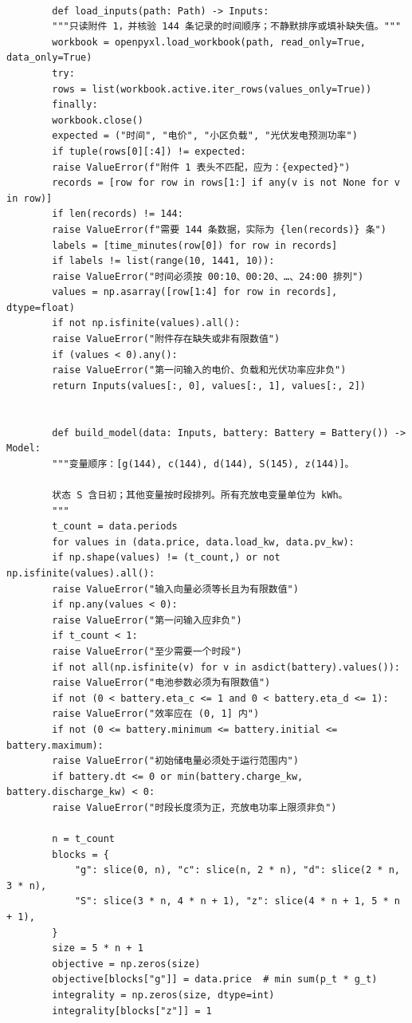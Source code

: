 \documentclass[UTF8]{ctexart}
\begin{document}
\begin{verbatim}
        
        def load_inputs(path: Path) -> Inputs:
        """只读附件 1，并核验 144 条记录的时间顺序；不静默排序或填补缺失值。"""
        workbook = openpyxl.load_workbook(path, read_only=True, data_only=True)
        try:
        rows = list(workbook.active.iter_rows(values_only=True))
        finally:
        workbook.close()
        expected = ("时间", "电价", "小区负载", "光伏发电预测功率")
        if tuple(rows[0][:4]) != expected:
        raise ValueError(f"附件 1 表头不匹配，应为：{expected}")
        records = [row for row in rows[1:] if any(v is not None for v in row)]
        if len(records) != 144:
        raise ValueError(f"需要 144 条数据，实际为 {len(records)} 条")
        labels = [time_minutes(row[0]) for row in records]
        if labels != list(range(10, 1441, 10)):
        raise ValueError("时间必须按 00:10、00:20、…、24:00 排列")
        values = np.asarray([row[1:4] for row in records], dtype=float)
        if not np.isfinite(values).all():
        raise ValueError("附件存在缺失或非有限数值")
        if (values < 0).any():
        raise ValueError("第一问输入的电价、负载和光伏功率应非负")
        return Inputs(values[:, 0], values[:, 1], values[:, 2])
        
        
        def build_model(data: Inputs, battery: Battery = Battery()) -> Model:
        """变量顺序：[g(144), c(144), d(144), S(145), z(144)]。
        
        状态 S 含日初；其他变量按时段排列。所有充放电变量单位为 kWh。
        """
        t_count = data.periods
        for values in (data.price, data.load_kw, data.pv_kw):
        if np.shape(values) != (t_count,) or not np.isfinite(values).all():
        raise ValueError("输入向量必须等长且为有限数值")
        if np.any(values < 0):
        raise ValueError("第一问输入应非负")
        if t_count < 1:
        raise ValueError("至少需要一个时段")
        if not all(np.isfinite(v) for v in asdict(battery).values()):
        raise ValueError("电池参数必须为有限数值")
        if not (0 < battery.eta_c <= 1 and 0 < battery.eta_d <= 1):
        raise ValueError("效率应在 (0, 1] 内")
        if not (0 <= battery.minimum <= battery.initial <= battery.maximum):
        raise ValueError("初始储电量必须处于运行范围内")
        if battery.dt <= 0 or min(battery.charge_kw, battery.discharge_kw) < 0:
        raise ValueError("时段长度须为正，充放电功率上限须非负")
        
        n = t_count
        blocks = {
            "g": slice(0, n), "c": slice(n, 2 * n), "d": slice(2 * n, 3 * n),
            "S": slice(3 * n, 4 * n + 1), "z": slice(4 * n + 1, 5 * n + 1),
        }
        size = 5 * n + 1
        objective = np.zeros(size)
        objective[blocks["g"]] = data.price  # min sum(p_t * g_t)
        integrality = np.zeros(size, dtype=int)
        integrality[blocks["z"]] = 1
        

\end{verbatim}
\end{document}
